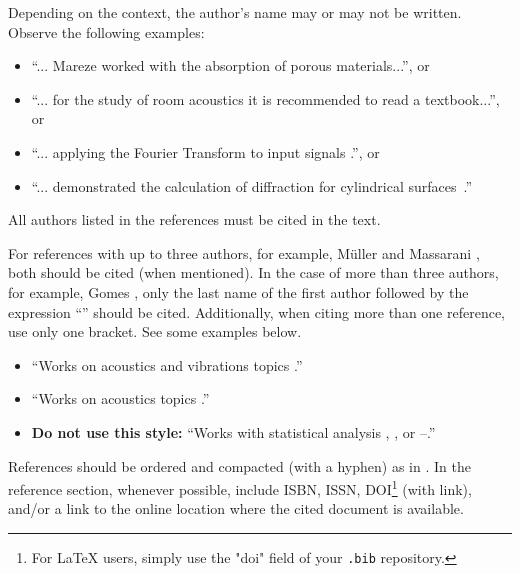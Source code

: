 Depending on the context, the author's name may or may not be written. Observe the following examples:
%
\begin{itemize}[noitemsep,topsep=0ex] \itemsep=4pt
	\item 	``... Mareze \etal \cite{Mareze-2019} worked with the absorption of porous materials...'', or 
	\item ``... for the study of room acoustics \cite{Brandao-2017} it is recommended to read a textbook...'', or
	\item ``... applying the Fourier Transform to input signals \cite{Oppenheim-2010}.'', or 
	\item ``...  demonstrated the calculation of diffraction for cylindrical surfaces~\cite{Fonseca-2013}.''
\end{itemize}
%
All authors listed in the references must be cited in the text.

For references with up to three authors, for example, Müller and Massarani \cite{Muller-2001}, both should be cited (when mentioned). In the case of more than three authors, for example, Gomes \etal \cite{Gomes-2015}, only the last name of the first author followed by the expression ``\etal'' should be cited. Additionally, when citing more than one reference, use only one bracket. See some examples below.
%
\begin{itemize}[noitemsep,topsep=0ex] \itemsep=8pt
	\item ``Works on acoustics and vibrations topics \cite{Mareze-2017,Fonseca-2013,Brandao-2017}.''
	\item ``Works on acoustics topics \cite{Mareze-2017,Oppenheim-2010,Muller-2001,Mareze-2019, jasa:2022eac}.''
	\item \textbf{Do not use this style:} ``Works with statistical analysis \cite{Mareze-2017}, \cite{Brandao-2017}, \cite{jasa:2022eac} or \cite{Mareze-2017}--\cite{jasa:2022eac}.''
\end{itemize}
%
References should be ordered and compacted (with a hyphen) as in \cite{Mareze-2017,Oppenheim-2010,Muller-2001,Mareze-2019}.
%
In the reference section, whenever possible, include ISBN, ISSN, DOI\footnote{For LaTeX users, simply use the "doi" field of your \texttt{.bib} repository.} (with link), and/or a link to the online location where the cited document is available.

